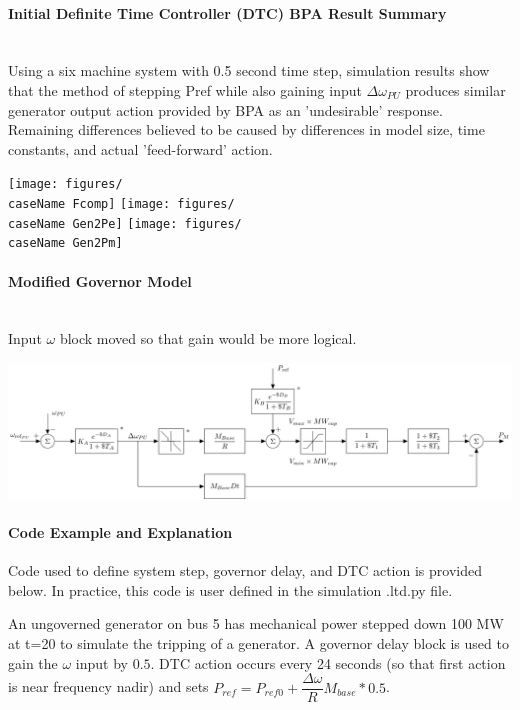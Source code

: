 \documentclass[12pt]{article}
\begin{document}
\paragraph{Initial Definite Time Controller (DTC) BPA Result Summary} \ \\
Using a six machine system with 0.5 second time step, simulation results show that the method of stepping Pref while also gaining input $\Delta\omega_{PU}$ produces similar generator output action provided by BPA as an 'undesirable' response.
Remaining differences believed to be caused by differences in model size, time constants, and actual 'feed-forward' action.

\newcommand{\caseName}{sixMachineGovDTC}
\texttt{[image: figures/\\caseName Fcomp]}
\texttt{[image: figures/\\caseName Gen2Pe]}
\texttt{[image: figures/\\caseName Gen2Pm]}


\paragraph{Modified Governor Model} \ \\
Input $\omega$ block moved so that gain would be more logical.

\includegraphics[width=\linewidth]{../../models/tgov1/tgov1DBdelay}

\pagebreak
\paragraph{Code Example and Explanation}
Code used to define system step, governor delay, and DTC action is provided below.
In practice, this code is user defined in the simulation .ltd.py file.\\
\vspace{1em}

An ungoverned generator on bus 5 has mechanical power stepped down 100 MW at t=20 to simulate the tripping of a generator.
A governor delay block is used to gain the $\omega$ input by $0.5$.
DTC action occurs every 24 seconds (so that first action is near frequency nadir) and sets  $P_{ref} = P_{ref0} + \dfrac{\Delta \omega}{R}M_{base} * 0.5 $.\\
\end{document}
